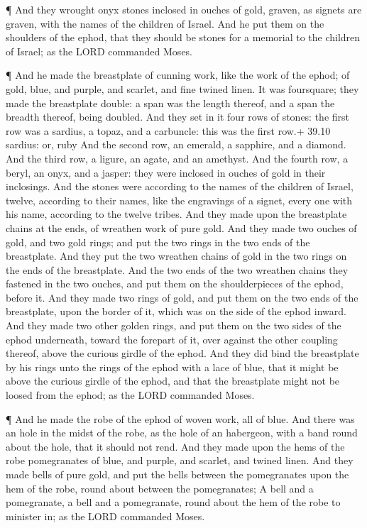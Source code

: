  ¶ And they wrought onyx stones inclosed in ouches of gold,
graven, as signets are graven, with the names of the children of Israel.
 And he put them on the shoulders of the ephod, that they
should be stones for a memorial to the children of Israel; as the LORD
commanded Moses.

 ¶ And he made the breastplate of cunning work, like the
work of the ephod; of gold, blue, and purple, and scarlet, and fine
twined linen.  It was foursquare; they made the breastplate
double: a span was the length thereof, and a span the breadth thereof,
being doubled.  And they set in it four rows of stones: the
first row was a sardius, a topaz, and a carbuncle: this was the first
row.+ 39.10 sardius: or, ruby  And the second row, an
emerald, a sapphire, and a diamond.  And the third row, a
ligure, an agate, and an amethyst.  And the fourth row, a
beryl, an onyx, and a jasper: they were inclosed in ouches of gold in
their inclosings.  And the stones were according to the
names of the children of Israel, twelve, according to their names, like
the engravings of a signet, every one with his name, according to the
twelve tribes.  And they made upon the breastplate chains
at the ends, of wreathen work of pure gold.  And they made
two ouches of gold, and two gold rings; and put the two rings in the two
ends of the breastplate.  And they put the two wreathen
chains of gold in the two rings on the ends of the breastplate.
 And the two ends of the two wreathen chains they fastened
in the two ouches, and put them on the shoulderpieces of the ephod,
before it.  And they made two rings of gold, and put them
on the two ends of the breastplate, upon the border of it, which was on
the side of the ephod inward.  And they made two other
golden rings, and put them on the two sides of the ephod underneath,
toward the forepart of it, over against the other coupling thereof,
above the curious girdle of the ephod.  And they did bind
the breastplate by his rings unto the rings of the ephod with a lace of
blue, that it might be above the curious girdle of the ephod, and that
the breastplate might not be loosed from the ephod; as the LORD
commanded Moses.

 ¶ And he made the robe of the ephod of woven work, all of
blue.  And there was an hole in the midst of the robe, as
the hole of an habergeon, with a band round about the hole, that it
should not rend.  And they made upon the hems of the robe
pomegranates of blue, and purple, and scarlet, and twined linen.
 And they made bells of pure gold, and put the bells
between the pomegranates upon the hem of the robe, round about between
the pomegranates;  A bell and a pomegranate, a bell and a
pomegranate, round about the hem of the robe to minister in; as the LORD
commanded Moses.

